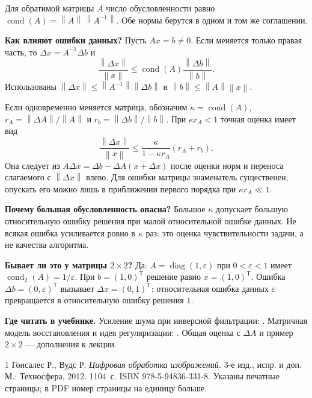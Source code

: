 \documentclass[12pt,a4paper]{article}
\theoremstyle{definition}
\theoremstyle{remark}
\DeclareMathOperator{\diag}{diag}
\DeclareMathOperator{\cond}{cond}
\newcommand{\norm}[1]{\left\lVert #1\right\rVert}
\begin{document}
Для обратимой матрицы $A$ число обусловленности равно
$\cond(A)=\norm{A}\,\norm{A^{-1}}$.
Обе нормы берутся в одном и том же соглашении.

\textbf{Как влияют ошибки данных?}
Пусть $Ax=b\ne0$. Если меняется только правая часть, то
$\Delta x=A^{-1}\Delta b$ и
\[
  \frac{\norm{\Delta x}}{\norm{x}}
  \leqslant\cond(A)\frac{\norm{\Delta b}}{\norm{b}}.
\]
Использованы $\norm{\Delta x}\leqslant\norm{A^{-1}}\norm{\Delta b}$
и $\norm{b}\leqslant\norm{A}\norm{x}$.

Если одновременно меняется матрица, обозначим
$\kappa=\cond(A)$,
$r_A=\norm{\Delta A}/\norm{A}$ и
$r_b=\norm{\Delta b}/\norm{b}$.
При $\kappa r_A<1$ точная оценка имеет вид
\[
  \boxed{\frac{\norm{\Delta x}}{\norm{x}}
  \leqslant\frac{\kappa}{1-\kappa r_A}(r_A+r_b)}.
\]
Она следует из
$A\Delta x=\Delta b-\Delta A(x+\Delta x)$ после оценки норм
и переноса слагаемого с $\norm{\Delta x}$ влево.
Для ошибки матрицы знаменатель существенен; опускать его можно
лишь в приближении первого порядка при $\kappa r_A\ll1$.

\textbf{Почему большая обусловленность опасна?}
Большое $\kappa$ допускает большую относительную ошибку решения
при малой относительной ошибке данных.
Не всякая ошибка усиливается ровно в $\kappa$ раз:
это оценка чувствительности задачи, а не качества алгоритма.

\textbf{Бывает ли это у матрицы $2\times2$?}
Да: $A=\diag(1,\varepsilon)$ при $0<\varepsilon<1$
имеет $\cond_2(A)=1/\varepsilon$.
При $b=(1,0)^{\mathsf T}$ решение равно $x=(1,0)^{\mathsf T}$.
Ошибка $\Delta b=(0,\varepsilon)^{\mathsf T}$ вызывает
$\Delta x=(0,1)^{\mathsf T}$: относительная ошибка данных
$\varepsilon$ превращается в относительную ошибку решения $1$.

\textbf{Где читать в учебнике.}
Усиление шума при инверсной фильтрации:
\cite[\S\,5.7, с.~412]{GW2012}.
Матричная модель восстановления и идея регуляризации:
\cite[\S\,5.9, с.~419--420]{GW2012}.
Общая оценка с $\Delta A$ и пример $2\times2$ --- дополнения к лекции.

\begingroup
\small
\begin{thebibliography}{1}
Гонсалес Р., Вудс Р. \emph{Цифровая обработка изображений.}
3-е изд., испр. и доп. М.: Техносфера, 2012. 1104~с.
ISBN 978-5-94836-331-8.
Указаны печатные страницы; в PDF номер страницы на единицу больше.
\end{thebibliography}
\endgroup
\end{document}
